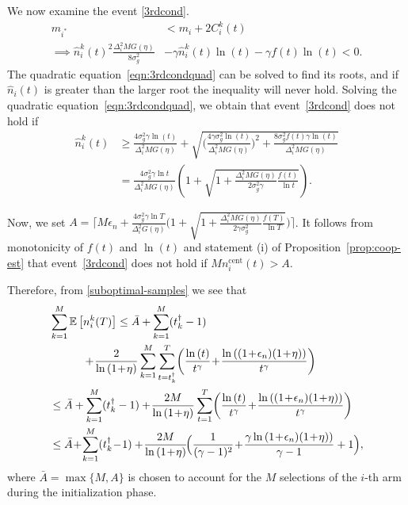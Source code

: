\documentclass[final,5p,times,twocolumn]{elsarticle}
\theoremstyle{definition}
\newcommand{\lnn}[1]{%
	\ln  \left(#1\right)%
}
\begin{document}
We now examine the event \eqref{3rdcond}. 
\begin{align}
m_{i^*} & < m_i + 2C_i^k(t) \nonumber \\ 
\implies \hat{n}_i^k(t)^2 \frac{\Delta_i^2M G(\eta)}{8 \sigma_g^2} &- \gamma \hat{n}_i^k(t)\ln(t) -  \gamma f(t) \ln(t) < 0. \label{eqn:3rdcondquad}
\end{align}
The quadratic equation~\eqref{eqn:3rdcondquad} can be solved to find its roots, and if $\hat{n}_i(t)$ is greater than the larger root the inequality will never hold.
Solving the quadratic equation~\eqref{eqn:3rdcondquad}, we obtain that event~\eqref{3rdcond} does not hold if
\begin{align*}
\hat{n}_i^k(t) &\geq \frac{ 4 \sigma_g^2 \gamma \ln(t)}{\Delta_i^2MG(\eta)} \!+\! \sqrt{\Big(\frac{4 \gamma \sigma_g^2 \ln(t)}{\Delta_i^2MG(\eta)}\Big)^2 \!+  \frac{8 \sigma_g^2f(t) \gamma \ln(t)}{\Delta_i^2 MG(\eta)}  } \\
& = \frac{4 \sigma_g^2 \gamma \ln t}{\Delta_i^2 MG(\eta)} \left( 1 + \sqrt{1 + \frac{\Delta_i^2 MG(\eta)}{2 \sigma_g^2 \gamma } \frac{f(t)}{\ln t}} \right).
\end{align*}


Now, we set $A = \Big\lceil M \epsilon_n + \frac{4 \sigma_g^2 \gamma \ln T}{\Delta_i^2 G(\eta)} \big( 1 + \sqrt{1 + \frac{ \Delta_i^2 M G(\eta)}{2 \gamma \sigma_g^2} \frac{f(T)}{\ln T}} \big)
\Big\rceil$. It follows from monotonicity of $f(t)$ and $\ln(t)$ and statement (i) of Proposition~\ref{prop:coop-est}
that event~\eqref{3rdcond} does not hold if $M n^{\text{cent}}_i(t) > A$.  

  Therefore, from \eqref{suboptimal-samples} we see that
\begin{align*} %
	&\sum_{k=1}^M  \mathbb{E} \left[ n_i^k(T)\right] \leq \bar{A} +  \sum_{k=1}^M (t_k^\dag-1)\\
	& \quad \qquad + \!\frac{2}{\lnn{1\!+\!\eta}} \sum_{k=1}^M \sum_{t=t_k^\dagger}^T \! \left( \frac{ \lnn{t}}{t^\gamma} \!+\! \frac{\lnn{(1\!+\!\epsilon_n)(1\!+\!\eta)}}{t^\gamma} \right) \\
	&%
	\leq \bar{A}+ \sum_{k=1}^M  (t_k^\dagger-1) %
	+ \!\frac{2M}{\lnn{1\!+\!\eta}} \sum_{t=1}^T \! \left( \frac{ \lnn{t}}{t^\gamma} \!+\! \frac{\lnn{(1\!+\!\epsilon_n)(1\!+\!\eta)}}{t^\gamma} \right) \\
	& %
	\leq \bar{A} \!+\! \sum_{k=1}^M  (t_k^\dagger\!-\!1) + \!\frac{2M}{\lnn{1\!+\!\eta}}  \! \Big( \frac{1}{(\gamma - 1)^2} %
	\!+\! {\frac{\gamma \lnn{1\!+\!\epsilon_n)(1\!+\!\eta)}}{\gamma - 1} +1}\Big), 
  \end{align*}  
  where $\bar{A} = \max\{M,A\}$  is chosen %
  to account for the $M$ selections of the $i$-th arm during the initialization phase. %
  
\end{document}
